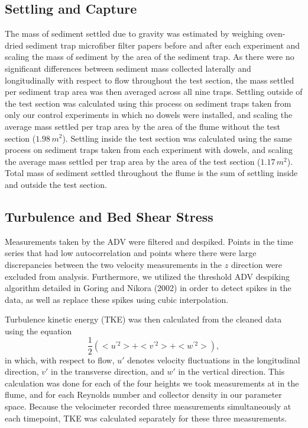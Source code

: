 \documentclass{scrreprt}
\begin{document}
\subsection{Settling and Capture}
The mass of sediment settled due to gravity was estimated by weighing oven-dried sediment trap microfiber filter papers before and after each experiment and scaling the mass of sediment by the area of the sediment trap. As there were no significant differences between sediment mass collected laterally and longitudinally with respect to flow throughout the test section, the mass settled per sediment trap area was then averaged across all nine traps. Settling outside of the test section was calculated using this process on sediment traps taken from only our control experiments in which no dowels were installed, and scaling the average mass settled per trap area by the area of the flume without the test section ($1.98\, m^{2}$). Settling inside the test section was calculated using the same process on sediment traps taken from each experiment with dowels, and scaling the average mass settled per trap area by the area of the test section ($1.17\, m^{2}$). Total mass of sediment settled throughout the flume is the sum of settling inside and outside the test section.

\subsection{Turbulence and Bed Shear Stress}
Measurements taken by the ADV were filtered and despiked. Points in the time series that had low autocorrelation and points where there were large discrepancies between the two velocity measurements in the $z$ direction were excluded from analysis. Furthermore, we utilized the threshold ADV despiking algorithm detailed in Goring and Nikora (2002) in order to detect spikes in the data, as well as replace these spikes using cubic interpolation.

Turbulence kinetic energy (TKE) was then calculated from the cleaned data using the equation 
\[\frac{1}{2}(<u^{'2}> + <v^{'2}> + <w^{'2}>),\]
in which, with respect to flow, $u'$ denotes velocity fluctuations in the longitudinal direction, $v'$ in the transverse direction, and $w'$ in the vertical direction. This calculation was done for each of the four heights we took measurements at in the flume, and for each Reynolds number and collector density in our parameter space. Because the velocimeter recorded three measurements simultaneously at each timepoint, TKE was calculated separately for these three measurements. 
\end{document}

